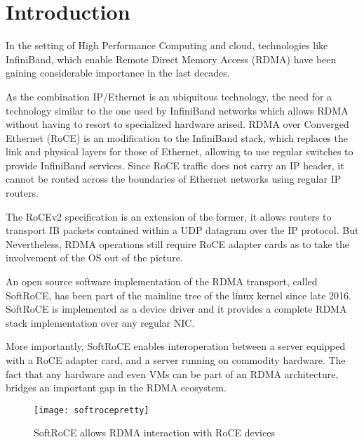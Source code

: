 \section{Introduction}

In the setting of High Performance Computing and cloud, technologies like InfiniBand, which enable Remote Direct Memory Access
(RDMA) have been gaining considerable importance in the last decades.

As the combination IP/Ethernet is an ubiquitous technology, the need for a technology similar
to the one used by InfiniBand networks which allows
RDMA without having to resort to specialized hardware arised. RDMA over Converged Ethernet (RoCE) is an modification
to the InfiniBand stack, which replaces the link and physical layers for those of Ethernet,
allowing to use regular switches to provide InfiniBand services. Since  RoCE traffic does not carry an IP header,
it cannot be routed across the boundaries of Ethernet networks using regular IP routers\cite{rocev2}.

The RoCEv2 specification is an extension of the former, it allows routers to transport
IB packets contained within a UDP datagram over the IP protocol. But Nevertheless, RDMA operations still require RoCE adapter
cards as to take the involvement of the OS out of the picture.

An open source software implementation of the RDMA transport, called SoftRoCE, has been part of the mainline tree of
the linux kernel since late 2016. SoftRoCE is implemented as a device driver and it provides a complete RDMA
stack implementation over any regular NIC\cite{softroce}.

More importantly, SoftRoCE enables interoperation between a server equipped with a RoCE adapter card, and a server running on
commodity hardware. The fact that any hardware and even VMs can be part of an RDMA architecture, bridges an important gap in the RDMA ecosystem.

\begin{figure}[h]
  \centering
  \texttt{[image: softrocepretty]}
  \caption[SoftRoCE]{SoftRoCE allows RDMA interaction with RoCE devices\footnotemark}
  \label{fig:softroce}
\end{figure}

